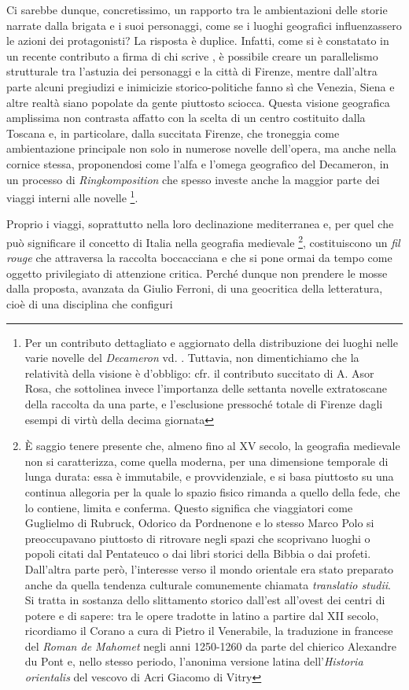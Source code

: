 Ci sarebbe dunque, concretissimo, un rapporto tra le ambientazioni delle
storie narrate dalla brigata e i suoi personaggi, come se i luoghi
geografici influenzassero le azioni dei protagonisti? La risposta è
duplice. Infatti, come si è constatato in un recente contributo a firma
di chi scrive \autocite{bolpagni2016}, è possibile creare un
parallelismo strutturale tra l'astuzia dei personaggi e la città di
Firenze, mentre dall'altra parte alcuni pregiudizi e inimicizie
storico-politiche fanno sì che Venezia, Siena e altre realtà siano
popolate da gente piuttosto sciocca. Questa visione geografica
amplissima non contrasta affatto con la scelta di un centro costituito
dalla Toscana e, in particolare, dalla succitata Firenze, che troneggia
come ambientazione principale non solo in numerose novelle dell'opera,
ma anche nella cornice stessa, proponendosi come l'alfa e l'omega
geografico del Decameron, in un processo di \emph{Ringkomposition} che
spesso investe anche la maggior parte dei viaggi interni alle novelle
\footnote{Per un contributo dettagliato e aggiornato della distribuzione
  dei luoghi nelle varie novelle del \emph{Decameron} vd.
  \autocite[p.~93]{cavallini2002}. Tuttavia, non dimentichiamo che la
  relatività della visione è d'obbligo: cfr. il contributo succitato di
  A. Asor Rosa, che sottolinea invece l'importanza delle settanta
  novelle extratoscane della raccolta da una parte, e l'esclusione
  pressoché totale di Firenze dagli esempi di virtù della decima
  giornata}.

Proprio i viaggi, soprattutto nella loro declinazione mediterranea e,
per quel che può significare il concetto di Italia nella geografia
medievale \footnote{È saggio tenere presente che, almeno fino al XV
  secolo, la geografia medievale non si caratterizza, come quella
  moderna, per una dimensione temporale di lunga durata: essa è
  immutabile, e provvidenziale, e si basa piuttosto su una continua
  allegoria per la quale lo spazio fisico rimanda a quello della fede,
  che lo contiene, limita e conferma. Questo significa che viaggiatori
  come Guglielmo di Rubruck, Odorico da Pordnenone e lo stesso Marco
  Polo si preoccupavano piuttosto di ritrovare negli spazi che
  scoprivano luoghi o popoli citati dal Pentateuco o dai libri storici
  della Bibbia o dai profeti. Dall'altra parte però, l'interesse verso
  il mondo orientale era stato preparato anche da quella tendenza
  culturale comunemente chiamata \emph{translatio studii}. Si tratta in
  sostanza dello slittamento storico dall'est all'ovest dei centri di
  potere e di sapere: tra le opere tradotte in latino a partire dal XII
  secolo, ricordiamo il Corano a cura di Pietro il Venerabile, la
  traduzione in francese del \emph{Roman de Mahomet} negli anni
  1250-1260 da parte del chierico Alexandre du Pont e, nello stesso
  periodo, l'anonima versione latina dell'\emph{Historia orientalis} del
  vescovo di Acri Giacomo di Vitry}, costituiscono un \emph{fil rouge}
che attraversa la raccolta boccacciana e che si pone ormai da tempo come
oggetto privilegiato di attenzione critica. Perché dunque non prendere
le mosse dalla proposta, avanzata da Giulio Ferroni, di una geocritica
della letteratura, cioè di una disciplina che configuri

